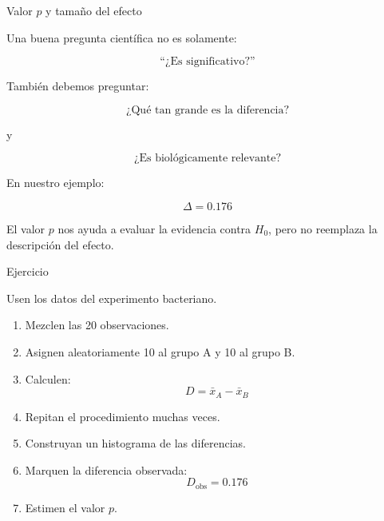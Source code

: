\documentclass[11pt, aspectratio=169]{beamer}
\begin{document}
\begin{frame}{Valor $p$ y tamaño del efecto}

Una buena pregunta científica no es solamente:

\[
\text{``¿Es significativo?''}
\]

También debemos preguntar:

\[
\boxed{\text{¿Qué tan grande es la diferencia?}}
\]

y

\[
\boxed{\text{¿Es biológicamente relevante?}}
\]

\vspace{0.5cm}

En nuestro ejemplo:

\vspace{-1em}

\[
\Delta = 0.176
\]

El valor $p$ nos ayuda a evaluar la evidencia contra $H_0$,
pero no reemplaza la descripción del efecto.

\end{frame}

\begin{frame}{Ejercicio}

Usen los datos del experimento bacteriano.

\vspace{0.3cm}

\begin{enumerate}
    \item Mezclen las 20 observaciones.
    \item Asignen aleatoriamente 10 al grupo A y 10 al grupo B.
    \item Calculen:
    \[
    D=\bar{x}_A-\bar{x}_B
    \]
    \item Repitan el procedimiento muchas veces.
    \item Construyan un histograma de las diferencias.
    \item Marquen la diferencia observada:
    \[
    D_{\mathrm{obs}}=0.176
    \]
    \item Estimen el valor $p$.
\end{enumerate}

\end{frame}
\end{document}
